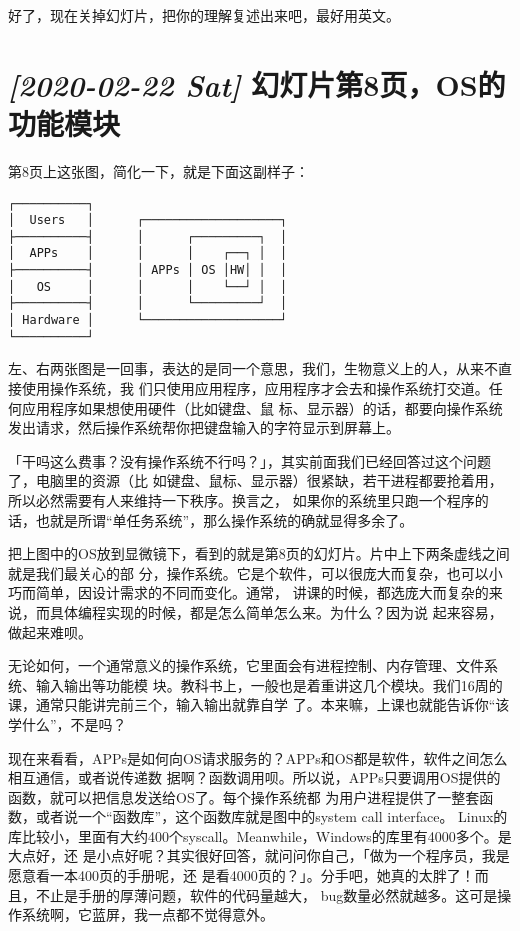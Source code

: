 \documentclass{wx672ctexart} [NO-DEFAULT-PACKAGES] \usepackage{wx672hyperref}
\begin{document}
好了，现在关掉幻灯片，把你的理解复述出来吧，最好用英文。

\section{\textit{[2020-02-22 Sat] } 幻灯片第8页，OS的功能模块}
\label{sec:org8df8309}

第8页上这张图，简化一下，就是下面这副样子：

\verbatimfont{\dejavu}
\begin{verbatim}
┌──────────┐
│  Users   │      ┌───────────────────┐
├──────────┤      │      ┌─────────┐  │
│  APPs    │      │      │    ┌──┐ │  │
├──────────┤      │ APPs │ OS │HW│ │  │
│   OS     │      │      │    └──┘ │  │
├──────────┤      │      └─────────┘  │
│ Hardware │      └───────────────────┘
└──────────┘
\end{verbatim}

左、右两张图是一回事，表达的是同一个意思，我们，生物意义上的人，从来不直接使用操作系统，我
们只使用应用程序，应用程序才会去和操作系统打交道。任何应用程序如果想使用硬件（比如键盘、鼠
标、显示器）的话，都要向操作系统发出请求，然后操作系统帮你把键盘输入的字符显示到屏幕上。

「干吗这么费事？没有操作系统不行吗？」，其实前面我们已经回答过这个问题了，电脑里的资源（比
如键盘、鼠标、显示器）很紧缺，若干进程都要抢着用，所以必然需要有人来维持一下秩序。换言之，
如果你的系统里只跑一个程序的话，也就是所谓“单任务系统”，那么操作系统的确就显得多余了。

把上图中的OS放到显微镜下，看到的就是第8页的幻灯片。片中上下两条虚线之间就是我们最关心的部
分，操作系统。它是个软件，可以很庞大而复杂，也可以小巧而简单，因设计需求的不同而变化。通常，
讲课的时候，都选庞大而复杂的来说，而具体编程实现的时候，都是怎么简单怎么来。为什么？因为说
起来容易，做起来难呗。

无论如何，一个通常意义的操作系统，它里面会有进程控制、内存管理、文件系统、输入输出等功能模
块。教科书上，一般也是着重讲这几个模块。我们16周的课，通常只能讲完前三个，输入输出就靠自学
了。本来嘛，上课也就能告诉你“该学什么”，不是吗？

现在来看看，APPs是如何向OS请求服务的？APPs和OS都是软件，软件之间怎么相互通信，或者说传递数
据啊？函数调用呗。所以说，APPs只要调用OS提供的函数，就可以把信息发送给OS了。每个操作系统都
为用户进程提供了一整套函数，或者说一个“函数库”，这个函数库就是图中的system call interface。
Linux的库比较小，里面有大约400个syscall。Meanwhile，Windows的库里有4000多个。是大点好，还
是小点好呢？其实很好回答，就问问你自己，「做为一个程序员，我是愿意看一本400页的手册呢，还
是看4000页的？」。分手吧，她真的太胖了！而且，不止是手册的厚薄问题，软件的代码量越大，
bug数量必然就越多。这可是操作系统啊，它蓝屏，我一点都不觉得意外。
\end{document}
